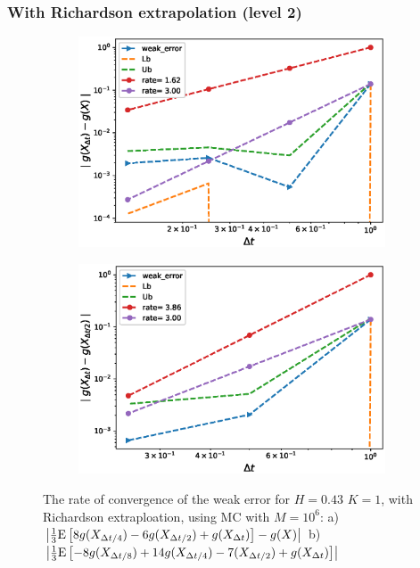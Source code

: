 \documentclass[11pt]{article}
\newcommand{\expt}[1]{\mathrm{E}\left[#1\right]}
\begin{document}
\newpage
\subsubsection*{With Richardson extrapolation (level 2)}

\begin{figure}[h!]
	\centering
	\begin{subfigure}{.4\textwidth}
		\centering
		\includegraphics[width=1\linewidth]{./figures/rBergomi_weak_error_rates/with_richardson/H_043/weak_convergence_order_Bergomi_H_043_K_1_richardson_level2_relative_M_10_6}
		\caption{}
		\label{fig:sub3}
	\end{subfigure}%
	\begin{subfigure}{.4\textwidth}
		\centering
		\includegraphics[width=1\linewidth]{./figures/rBergomi_weak_error_rates/with_richardson/H_043/weak_convergence_order_differences_Bergomi_H_043_K_1_richardson_level2_relative_M_10_6}
		\caption{}
		\label{fig:sub4}
	\end{subfigure}
	
	\caption{The rate of convergence of the weak error for $H=0.43$ $K=1$, with Richardson extraploation, using MC with $M=10^6$: a) $\abs{\frac{1}{3}\expt{8 g(X_{\Delta t/4}) -6g(X_{\Delta t/2}) +g(X_{\Delta t})}-g(X)}$  b) $\abs{\frac{1}{3}\expt{-8 g(X_{\Delta t/8}) +14g(X_{\Delta t/4})-7 (X_{\Delta t/2}) +g(X_{\Delta t})}}$}
	\label{fig:Weak_rate_H_043_with_rich_level2}
\end{figure}
\end{document}
